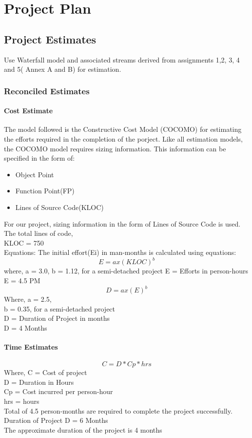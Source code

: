 \documentclass[oneside,a4paper,12pt]{report}
\begin{document}
\clearpage


\chapter{Project Plan}

\section{Project Estimates}
                 Use Waterfall model and associated streams derived from assignments 1,2, 3, 4 and 5( Annex A and B) for estimation.
\subsection{Reconciled Estimates}
\subsubsection{Cost Estimate}
\hspace*{0.25 in}
The model followed is the Constructive Cost Model (COCOMO) for estimating the
efforts required in the completion of the porject. Like all estimation models, the
COCOMO model requires sizing information. This information can be specified in
the form of:
\begin{itemize}
  \item Object Point
  \item Function Point(FP)
  \item Lines of Source Code(KLOC)
\end{itemize}
For our project, sizing information in the form of Lines of Source Code is used. The
total lines of code,\\
KLOC = 750\\
Equations: The initial effort(Ei) in man-months is calculated using equations:\\

\[E=ax(KLOC)^b\]
\hspace*{0.25 in}where, a = 3.0, b = 1.12, for a semi-detached project
E = Efforts in person-hours\\
E = 4.5 PM\\
\[D=ax(E)^b\]
Where, a = 2.5,\\
b = 0.35, for a semi-detached project\\
D = Duration of Project in months\\
D = 4 Months\\

\subsubsection{Time Estimates}
\[C=D*Cp*hrs\]
Where, C = Cost of project\\
D = Duration in Hours\\
Cp = Cost incurred per person-hour\\
hrs = hours\\
Total of 4.5 person-months are required to complete the project successfully.\\
Duration of Project D = 6 Months\\
The approximate duration of the project is 4 months\\
\end{document}
